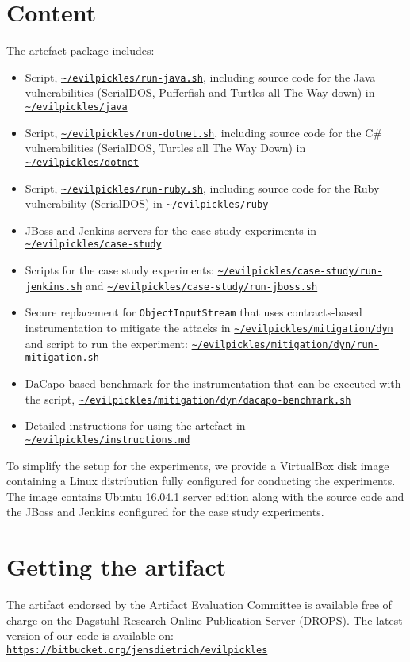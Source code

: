 \documentclass[a4paper,UKenglish]{darts}
\newenvironment{content}{\section{Content}}{}
\newenvironment{getting}{\section{Getting the artifact} The artifact 
endorsed by the Artifact Evaluation Committee is available free of 
charge on the Dagstuhl Research Online Publication Server (DROPS).}{}
\begin{document}
\begin{content}
  The artefact package includes:

  \begin{itemize}
  \item Script, \texttt{\url{~/evilpickles/run-java.sh}}, including source code for the Java vulnerabilities (SerialDOS, Pufferfish and Turtles all The Way down) in \texttt{\url{~/evilpickles/java}}
  \item Script, \texttt{\url{~/evilpickles/run-dotnet.sh}}, including source code for the C\# vulnerabilities (SerialDOS, Turtles all The Way Down) in \texttt{\url{~/evilpickles/dotnet}}
    \item Script, \texttt{\url{~/evilpickles/run-ruby.sh}}, including source code for the Ruby vulnerability (SerialDOS) in \texttt{\url{~/evilpickles/ruby}}
  \item JBoss and Jenkins servers for the case study experiments in \texttt{\url{~/evilpickles/case-study}}
  \item Scripts for the case study experiments: \texttt{\url{~/evilpickles/case-study/run-jenkins.sh}} and \texttt{\url{~/evilpickles/case-study/run-jboss.sh}}
  \item Secure replacement for \texttt{ObjectInputStream} that uses contracts-based instrumentation to mitigate the attacks in \texttt{\url{~/evilpickles/mitigation/dyn}} and script to run the experiment: \texttt{\url{~/evilpickles/mitigation/dyn/run-mitigation.sh}}
  \item DaCapo-based benchmark for the instrumentation that can be executed with the script, \texttt{\url{~/evilpickles/mitigation/dyn/dacapo-benchmark.sh}}
    \item Detailed instructions for using the artefact in \texttt{\url{~/evilpickles/instructions.md}}

  \end{itemize}
   To simplify the setup for the experiments, we provide a VirtualBox disk
  image containing a Linux distribution fully configured for
  conducting the experiments. The image contains Ubuntu 16.04.1 server edition along with the source code and the JBoss and Jenkins configured for the case study experiments.
\end{content} 

\begin{getting}
  The latest version of our code is available on:
  \texttt{{\url {https://bitbucket.org/jensdietrich/evilpickles}}}

\end{getting} 
\end{document}
